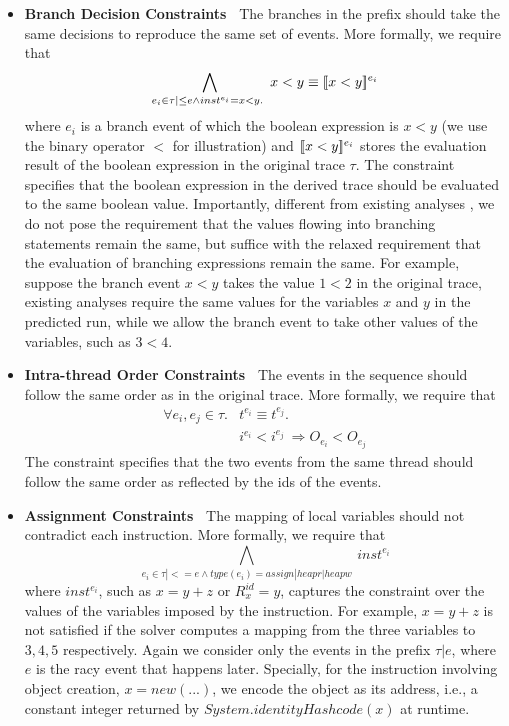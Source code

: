 \begin{itemize}
\item {\bf Branch Decision Constraints\ } The branches in the prefix should take the same decisions to reproduce the same set of events. More formally,  
we require that 
$$
\bigwedge_{e_i \in \tau|\leq e \wedge  inst^{e_i}=x<y.\ }  x<y 	\equiv \lbrack\!\lbrack x<y \rbrack\!\rbrack^{e_i}
$$ 
where $e_i$ is a branch event of which the boolean expression is $x<y$ (we use the binary operator $<$ for illustration) and  $\lbrack\!\lbrack x<y \rbrack\!\rbrack^{e_i}$ stores the  evaluation result of the boolean expression in the original trace $\tau$. The constraint specifies that the boolean expression in the derived trace should be evaluated to the same boolean value. Importantly, different from existing analyses \cite{yannis,pldi14}, we do not pose the requirement that the values flowing into branching statements remain the same, but suffice with the relaxed requirement that the evaluation of branching expressions remain the same. For example, suppose  the branch event $x<y$ takes the value $1<2$ in the original trace, existing analyses require the same values for the variables $x$ and $y$ in the predicted run, while we allow  the branch event to take other values of the variables, such as $3<4$. 
\item {\bf Intra-thread Order Constraints\ } The events in the sequence should follow the same order as in the original trace. More formally, we require that
$$
\begin{array}{rl}
\forall e_i, e_j \in \tau. & t^{e_i}\equiv t^{e_j}. \\
& i^{e_i} < i^{e_j}\  \Rightarrow O_{e_i} < O_{e_j}
\end{array}
$$ 
The constraint specifies that the two events from the same thread should follow the same order as reflected by the ids of the events.
\item {\bf Assignment Constraints\ } The mapping of local variables should not contradict each instruction.   More formally, we require that
$$
\bigwedge_{e_i \in \tau|<=e \wedge type(e_i)=assign|heapr|heapw}\
	inst^{e_i}
$$
where $inst^{e_i}$, such as $x=y+z$ or $R^{id}_{x}=y$, captures the constraint over the values of the variables imposed by the instruction. For example, $x=y+z$ is not satisfied if the solver computes a mapping from the three variables to $3, 4, 5$ respectively. Again we consider only the events in the prefix $\tau|e$, where $e$ is the racy event that happens later. Specially, for the instruction involving object creation, $x=new (...)$, we encode the object as its address, i.e., a constant integer returned by $System.identityHashcode(x)$ at runtime.
\end{itemize}





